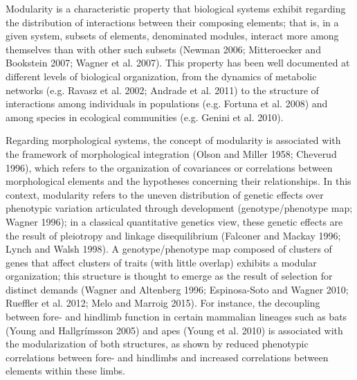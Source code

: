 \documentclass[12pt,]{article}
\begin{document}
Modularity is a characteristic property that biological systems exhibit
regarding the distribution of interactions between their composing
elements; that is, in a given system, subsets of elements, denominated
modules, interact more among themselves than with other such subsets
(Newman 2006; Mitteroecker and Bookstein 2007; Wagner et al. 2007). This
property has been well documented at different levels of biological
organization, from the dynamics of metabolic networks (e.g. Ravasz et
al. 2002; Andrade et al. 2011) to the structure of interactions among
individuals in populations (e.g. Fortuna et al. 2008) and among species
in ecological communities (e.g. Genini et al. 2010).

Regarding morphological systems, the concept of modularity is associated
with the framework of morphological integration (Olson and Miller 1958;
Cheverud 1996), which refers to the organization of covariances or
correlations between morphological elements and the hypotheses
concerning their relationships. In this context, modularity refers to
the uneven distribution of genetic effects over phenotypic variation
articulated through development (genotype/phenotype map; Wagner 1996);
in a classical quantitative genetics view, these genetic effects are the
result of pleiotropy and linkage disequilibrium (Falconer and Mackay
1996; Lynch and Walsh 1998). A genotype/phenotype map composed of
clusters of genes that affect clusters of traits (with little overlap)
exhibits a modular organization; this structure is thought to emerge as
the result of selection for distinct demands (Wagner and Altenberg 1996;
Espinosa-Soto and Wagner 2010; Rueffler et al. 2012; Melo and Marroig
2015). For instance, the decoupling between fore- and hindlimb function
in certain mammalian lineages such as bats (Young and Hallgrímsson 2005)
and apes (Young et al. 2010) is associated with the modularization of
both structures, as shown by reduced phenotypic correlations between
fore- and hindlimbs and increased correlations between elements within
these limbs.
\end{document}
